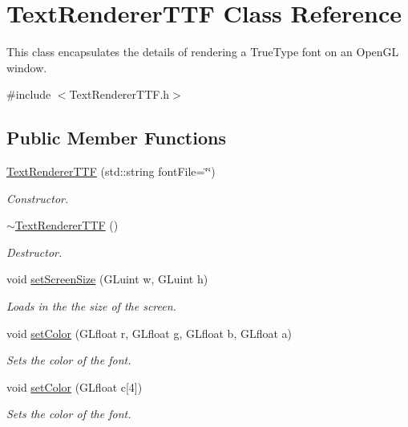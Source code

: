 \hypertarget{class_text_renderer_t_t_f}{}\section{Text\+Renderer\+T\+TF Class Reference}
\label{class_text_renderer_t_t_f}


This class encapsulates the details of rendering a True\+Type font on an Open\+GL window.  




{\ttfamily \#include $<$Text\+Renderer\+T\+T\+F.\+h$>$}

\subsection*{Public Member Functions}
\begin{DoxyCompactItemize}
\item 
\hyperlink{class_text_renderer_t_t_f_a3e2faacd9efeadf1b3e3226798ac720c}{Text\+Renderer\+T\+TF} (std\+::string font\+File=\char`\"{}\char`\"{})
\begin{DoxyCompactList}\small\item\em Constructor. \end{DoxyCompactList}\item 
\hyperlink{class_text_renderer_t_t_f_aa516278b8a3837fb84a698a53b9d9323}{$\sim$\+Text\+Renderer\+T\+TF} ()
\begin{DoxyCompactList}\small\item\em Destructor. \end{DoxyCompactList}\item 
void \hyperlink{class_text_renderer_t_t_f_abf833b9d51f930b3e3ccfe8794aa0abe}{set\+Screen\+Size} (G\+Luint w, G\+Luint h)
\begin{DoxyCompactList}\small\item\em Loads in the the size of the screen. \end{DoxyCompactList}\item 
void \hyperlink{class_text_renderer_t_t_f_aef124230f4c3564b097ed844e052a2ce}{set\+Color} (G\+Lfloat r, G\+Lfloat g, G\+Lfloat b, G\+Lfloat a)
\begin{DoxyCompactList}\small\item\em Sets the color of the font. \end{DoxyCompactList}\item 
void \hyperlink{class_text_renderer_t_t_f_aeca067cccd24f121ca17e44445e7ad5a}{set\+Color} (G\+Lfloat c\mbox{[}4\mbox{]})
\begin{DoxyCompactList}\small\item\em Sets the color of the font. \end{DoxyCompactList}\item 

\end{DoxyCompactItemize}
